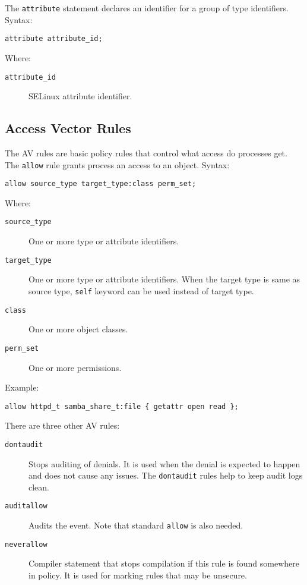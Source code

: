 The \texttt{attribute} statement declares an identifier for a group of type
identifiers. Syntax:
\begin{lstlisting}
attribute attribute_id;
\end{lstlisting}
Where:
\begin{description}
    \item [\texttt{attribute\_id}] SELinux attribute identifier.
\end{description}



\subsection{Access Vector Rules}
\label{avrules}

The AV rules are basic policy rules that control what access do processes get.
The \texttt{allow} rule grants process an access to an object. Syntax:
\begin{lstlisting}
allow source_type target_type:class perm_set;
\end{lstlisting}
Where:
\begin{description}
    \item [\texttt{source\_type}] One or more type or attribute identifiers.
    \item [\texttt{target\_type}] One or more type or attribute identifiers.
        When the target type is same as source type, \texttt{self} keyword can
        be used instead of target type.
    \item [\texttt{class}] One or more object classes.
    \item [\texttt{perm\_set}] One or more permissions.
\end{description}
Example:
\begin{lstlisting}
allow httpd_t samba_share_t:file { getattr open read };
\end{lstlisting}

There are three other AV rules:
\begin{description}
    \item [\texttt{dontaudit}] Stops auditing of denials. It is used when the
        denial is expected to happen and does not cause any issues. The
        \texttt{dontaudit} rules help to keep audit logs clean.
    \item [\texttt{auditallow}] Audits the event. Note that standard
        \texttt{allow} is also needed.
    \item [\texttt{neverallow}] Compiler statement that stops compilation if
        this rule is found somewhere in policy. It is used for marking rules
        that may be unsecure.
\end{description}

